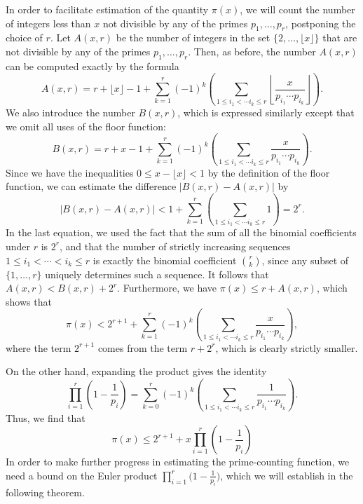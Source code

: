 In order to facilitate estimation of the quantity $\pi(x)$, we will count the number of integers less than $x$ not divisible by any of the primes $p_1,\ldots,p_r$, postponing the choice of $r$. Let $A(x,r)$ be the number of integers in the set $\{2,\ldots,\lfloor x\rfloor\}$ that are not divisible by any of the primes $p_1,\ldots,p_r$. Then, as before, the number $A(x,r)$ can be computed exactly by the formula
\begin{equation*}
  A(x,r) = r + \lfloor x\rfloor -1  + \sum_{k=1}^{r}(-1)^{k}\left(\sum_{1\leq i_1<\cdots i_k\leq r}\left\lfloor\frac{x}{p_{i_1}\cdots p_{i_k}}\right\rfloor\right). 
\end{equation*}
We also introduce the number $B(x,r)$, which is expressed similarly except that we omit all uses of the floor function:
\begin{equation*}
  B(x,r) = r + x -1  + \sum_{k=1}^{r}(-1)^{k}\left(\sum_{1\leq i_1<\cdots i_k\leq r}\frac{x}{p_{i_1}\cdots p_{i_k}}\right). 
\end{equation*}
Since we have the inequalities $0\leq x-\lfloor x\rfloor < 1$ by the definition of the floor function, we can estimate the difference $|B(x,r)-A(x,r)|$ by
\begin{equation*}
  |B(x,r)-A(x,r)| < 1 + \sum_{k=1}^{r}\left(\sum_{1\leq i_1<\cdots i_k\leq r}1\right)= 2^r.
\end{equation*}
In the last equation, we used the fact that the sum of all the binomial coefficients under $r$ is $2^r$, and that the number of strictly increasing sequences $1\leq i_1<\cdots <i_k\leq r$ is exactly the binomial coefficient $\binom{r}{k}$, since any subset of $\{1,\ldots,r\}$ uniquely determines such a sequence. It follows that $A(x,r)< B(x,r)+2^r$. Furthermore, we have $\pi(x)\leq r+A(x,r)$, which shows that
\begin{equation*}
  \pi(x) < 2^{r+1} + \sum_{k=1}^{r}(-1)^{k}\left(\sum_{1\leq i_1<\cdots i_k\leq r}\frac{x}{p_{i_1}\cdots p_{i_k}}\right),
\end{equation*}
where the term $2^{r+1}$ comes from the term $r+2^r$, which is clearly strictly smaller.

On the other hand, expanding the product gives the identity
\begin{equation*}
  \prod_{i=1}^r\left(1-\frac{1}{p_i}\right) = \sum_{k=0}^{r}(-1)^{k}\left(\sum_{1\leq i_1<\cdots i_k\leq r}\frac{1}{p_{i_1}\cdots p_{i_k}}\right).
\end{equation*}
Thus, we find that
\begin{equation*}
  \pi(x) \leq 2^{r+1} + x \prod_{i=1}^r\left(1-\frac{1}{p_i}\right)
\end{equation*}
In order to make further progress in estimating the prime-counting function, we need a bound on the Euler product $\prod_{i=1}^r\bigl(1-\frac{1}{p_i}\bigr)$, which we will establish in the following theorem.
  
